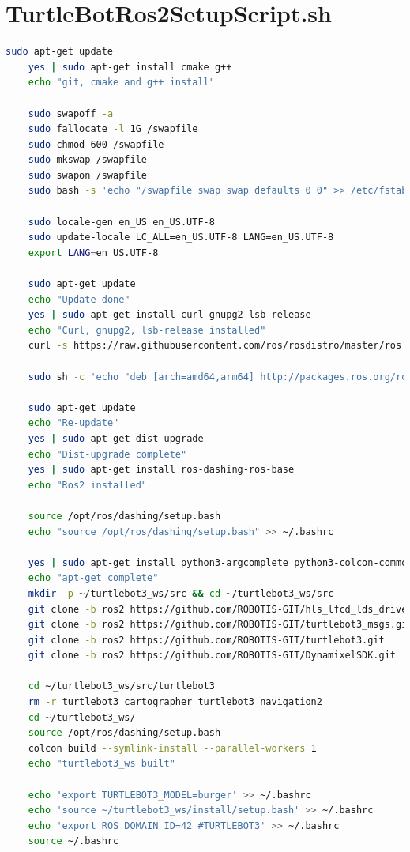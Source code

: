 \documentclass[10pt,a4paper]{report}
\begin{document}
\appendix
\section*{TurtleBotRos2SetupScript.sh}
\begin{lstlisting}[language=BASH]
	sudo apt-get update
	yes | sudo apt-get install cmake g++
	echo "git, cmake and g++ install"
	
	sudo swapoff -a
	sudo fallocate -l 1G /swapfile
	sudo chmod 600 /swapfile
	sudo mkswap /swapfile
	sudo swapon /swapfile
	sudo bash -s 'echo "/swapfile swap swap defaults 0 0" >> /etc/fstab'
	
	sudo locale-gen en_US en_US.UTF-8
	sudo update-locale LC_ALL=en_US.UTF-8 LANG=en_US.UTF-8
	export LANG=en_US.UTF-8
	
	sudo apt-get update
	echo "Update done"
	yes | sudo apt-get install curl gnupg2 lsb-release
	echo "Curl, gnupg2, lsb-release installed"
	curl -s https://raw.githubusercontent.com/ros/rosdistro/master/ros.asc | sudo apt-key add -
	
	sudo sh -c 'echo "deb [arch=amd64,arm64] http://packages.ros.org/ros2/ubuntu `lsb_release -cs` main" > /etc/apt/sources.list.d/ros2-latest.list'
	
	sudo apt-get update
	echo "Re-update"
	yes | sudo apt-get dist-upgrade
	echo "Dist-upgrade complete"
	yes | sudo apt-get install ros-dashing-ros-base
	echo "Ros2 installed"
	
	source /opt/ros/dashing/setup.bash
	echo "source /opt/ros/dashing/setup.bash" >> ~/.bashrc
	
	yes | sudo apt-get install python3-argcomplete python3-colcon-common-extensions libboost-system-dev
	echo "apt-get complete"
	mkdir -p ~/turtlebot3_ws/src && cd ~/turtlebot3_ws/src
	git clone -b ros2 https://github.com/ROBOTIS-GIT/hls_lfcd_lds_driver.git
	git clone -b ros2 https://github.com/ROBOTIS-GIT/turtlebot3_msgs.git
	git clone -b ros2 https://github.com/ROBOTIS-GIT/turtlebot3.git
	git clone -b ros2 https://github.com/ROBOTIS-GIT/DynamixelSDK.git
	
	cd ~/turtlebot3_ws/src/turtlebot3
	rm -r turtlebot3_cartographer turtlebot3_navigation2
	cd ~/turtlebot3_ws/
	source /opt/ros/dashing/setup.bash
	colcon build --symlink-install --parallel-workers 1
	echo "turtlebot3_ws built"
	
	echo 'export TURTLEBOT3_MODEL=burger' >> ~/.bashrc
	echo 'source ~/turtlebot3_ws/install/setup.bash' >> ~/.bashrc
	echo 'export ROS_DOMAIN_ID=42 #TURTLEBOT3' >> ~/.bashrc
	source ~/.bashrc
	

\end{lstlisting}
\end{document}
